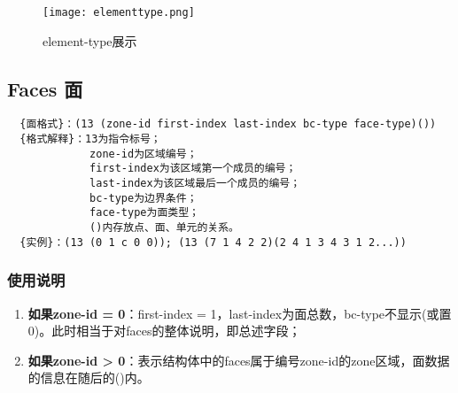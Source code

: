 \documentclass[lang=cn,11pt,a4paper]{elegantpaper} %
\begin{document}
\begin{figure}[!htb]
  \centering
  \texttt{[image: elementtype.png]}
  \caption{element-type展示}
  \label{elementtype}
\end{figure}

\subsection{Faces 面}\label{Faces}
\begin{lstlisting}
  {面格式}：(13 (zone-id first-index last-index bc-type face-type)())
  {格式解释}：13为指令标号；
             zone-id为区域编号；
             first-index为该区域第一个成员的编号；
             last-index为该区域最后一个成员的编号；
             bc-type为边界条件；
             face-type为面类型；
             ()内存放点、面、单元的关系。
  {实例}：(13 (0 1 c 0 0)); (13 (7 1 4 2 2)(2 4 1 3 4 3 1 2...))
\end{lstlisting}

\subsubsection{使用说明}
\begin{enumerate}
  \item \textbf{如果zone-id = 0}：first-index = 1，last-index为面总数，bc-type不显示(或置0)。此时相当于对faces的整体说明，即总述字段；
  \item \textbf{如果zone-id > 0}：表示结构体中的faces属于编号zone-id的zone区域，面数据的信息在随后的()内。
\end{enumerate}
\end{document}
